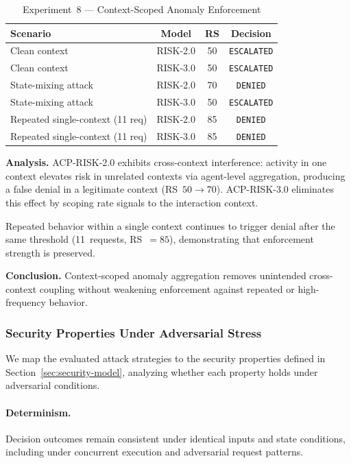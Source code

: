 \documentclass[11pt]{article}
\theoremstyle{definition}
\begin{document}
\begin{table}[h]
\centering
\caption{Experiment~8 --- Context-Scoped Anomaly Enforcement}
\label{tab:exp8}
\begin{tabular}{lccc}
\toprule
Scenario & Model & RS & Decision \\
\midrule
Clean context & RISK-2.0 & 50 & \texttt{ESCALATED} \\
Clean context & RISK-3.0 & 50 & \texttt{ESCALATED} \\
\midrule
State-mixing attack & RISK-2.0 & 70 & \texttt{DENIED} \\
State-mixing attack & RISK-3.0 & 50 & \texttt{ESCALATED} \\
\midrule
Repeated single-context (11 req) & RISK-2.0 & 85 & \texttt{DENIED} \\
Repeated single-context (11 req) & RISK-3.0 & 85 & \texttt{DENIED} \\
\bottomrule
\end{tabular}
\end{table}

\textbf{Analysis.}
ACP-RISK-2.0 exhibits cross-context interference: activity in one context
elevates risk in unrelated contexts via agent-level aggregation, producing
a false denial in a legitimate context (RS~$50 \to 70$). ACP-RISK-3.0
eliminates this effect by scoping rate signals to the interaction context.

Repeated behavior within a single context continues to trigger denial after
the same threshold (11~requests, RS~$= 85$), demonstrating that enforcement
strength is preserved.

\textbf{Conclusion.}
Context-scoped anomaly aggregation removes unintended cross-context coupling
without weakening enforcement against repeated or high-frequency behavior.

\subsubsection*{Security Properties Under Adversarial Stress}

We map the evaluated attack strategies to the security properties defined in
Section~\ref{sec:security-model}, analyzing whether each property holds under
adversarial conditions.

\paragraph{Determinism.}
Decision outcomes remain consistent under identical inputs and state conditions,
including under concurrent execution and adversarial request patterns.
\end{document}
